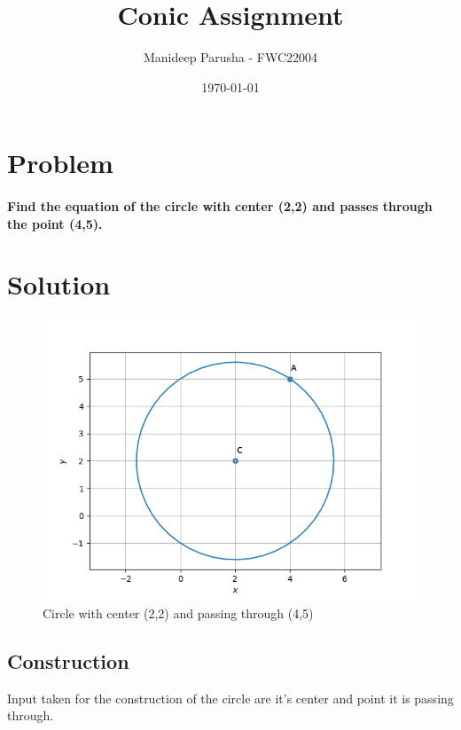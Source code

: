 \documentclass[journal,12pt,twocolumn]{article}
\title{\textbf{Conic Assignment}}
\author{Manideep Parusha - FWC22004}
\date{\today}
\begin{document}
\maketitle
\section*{Problem}
\paragraph{Find the equation of the circle with center (2,2) and passes through the point (4,5).}

\section*{Solution}

\begin{figure}[h]
\centering
\includegraphics[width=\columnwidth]{figs/plot_con.png}
	\caption{Circle with center (2,2) and passing through (4,5)}
\label{fig:con_py}
\end{figure}

\subsection*{Construction}
Input taken for the construction of the circle are it's center and point it is passing through.
\end{document}
